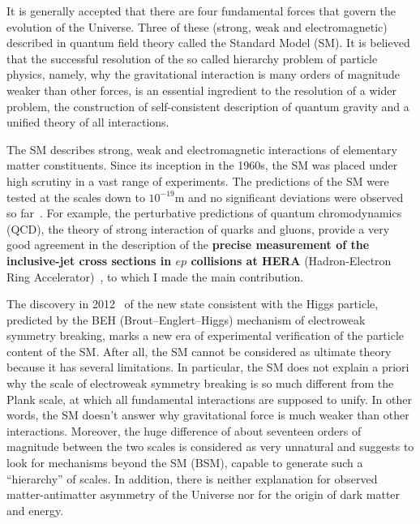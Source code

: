\textcolor{\mycolor}{
It is generally accepted that there are four fundamental forces that govern the evolution of the Universe. \textcolor{\mycolor}{Three of these (strong, weak and electromagnetic) described in quantum field theory called the Standard Model (SM).} It is believed that the successful resolution of the so called hierarchy problem of particle physics, namely, why the gravitational interaction is many orders of magnitude weaker than other forces, is an essential ingredient to the resolution of a wider problem, the construction of self-consistent description of quantum gravity and a unified theory of all interactions.}

\textcolor{\mycolor}{
The SM describes strong, weak and electromagnetic interactions of elementary matter constituents. Since its inception in the 1960s, the SM was placed under high scrutiny in a vast range of experiments. The predictions of the SM were tested at the scales down to $10^{-19}$m and no significant deviations were observed so far~\cite{Agashe:2014kda}. For example, the perturbative predictions of quantum chromodynamics (QCD), the theory of strong interaction of quarks and gluons, provide a very good agreement in the description of the \textbf{precise measurement of the inclusive-jet cross sections in $ep$ collisions at HERA} (Hadron-Electron Ring Accelerator)~\cite{Abramowicz:2012jz}, to which I made the main contribution.}

\textcolor{\mycolor}{
The discovery in 2012~\cite{Aad:2012tfa,Chatrchyan:2012xdj} of the new state consistent with the Higgs particle, predicted by the BEH (Brout--Englert--Higgs) mechanism of electroweak symmetry breaking, marks a new era of experimental verification of the particle content of the SM. After all, the SM cannot be considered as ultimate theory because it has several limitations. In particular, the SM does not explain a priori why the scale of electroweak symmetry breaking is so much different from the Plank scale, at which all fundamental interactions are supposed to unify. In other words, the SM doesn't answer why gravitational force is much weaker than other interactions. Moreover, the huge difference of about seventeen orders of magnitude between the two scales is considered as very unnatural and suggests to look for mechanisms beyond the SM (BSM), capable to generate such a ``hierarchy'' of scales. In addition, there is neither explanation for observed matter-antimatter asymmetry of the Universe nor for the origin of dark matter and energy.}

